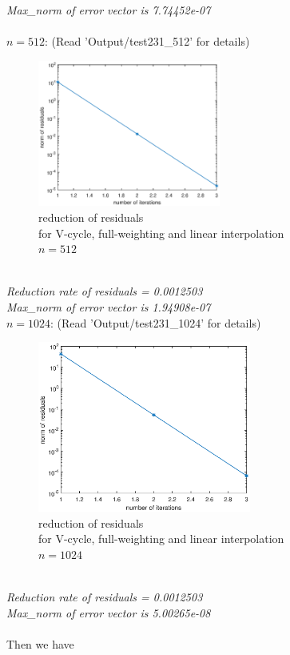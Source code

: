 \documentclass[a4paper,twocolumn]{article}
\theoremstyle{definition}
\begin{document}
\emph{Max\_norm of error vector is 7.74452e-07}\\\\
$n=512$: (Read 'Output/test231\_512' for details)
\begin{figure}[!htp]   
	\centering
	\includegraphics[width=6cm]{Pictures/F231_3.eps}
	\caption{reduction of residuals \\for V-cycle, full-weighting and linear interpolation\\ $n = 512$}
\end{figure}\\
\noindent \emph{Reduction rate of residuals = 0.0012503}\\
\emph{Max\_norm of error vector is 1.94908e-07}\\
\newpage
\noindent $n=1024$: (Read 'Output/test231\_1024' for details)
\begin{figure}[!htp]   
	\centering
	\includegraphics[width=7cm]{Pictures/F231_4.eps}
	\caption{reduction of residuals \\for V-cycle, full-weighting and linear interpolation\\ $n = 1024$}
\end{figure}\\
\noindent \emph{Reduction rate of residuals = 0.0012503}\\
\emph{Max\_norm of error vector is 5.00265e-08}\\\\
Then we have
\end{document}
